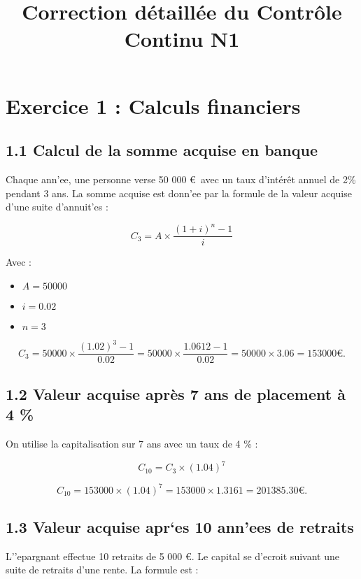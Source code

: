 \documentclass[a4paper, 12pt]{article}
\begin{document}
	
	\title{Correction détaillée du Contrôle Continu N\textsuperscript{\textdegree}1}
	\author{}
	\date{}
	\maketitle
	
	\section*{Exercice 1 : Calculs financiers}
	
	\subsection*{1.1 Calcul de la somme acquise en banque}
	Chaque ann'ee, une personne verse 50 000 \euro\ avec un taux d'intérêt annuel de 2\% pendant 3 ans. La somme acquise est donn'ee par la formule de la valeur acquise d'une suite d'annuit'es :
	
	\begin{equation}
		C_3 = A \times \frac{(1+i)^n -1}{i}
	\end{equation}
	
	Avec :
	\begin{itemize}
		\item $ A = 50 000 $
		\item $ i = 0.02 $
		\item $ n = 3 $
	\end{itemize}
	
	\begin{equation}
		C_3 = 50 000 \times \frac{(1.02)^3 -1}{0.02} = 50 000 \times \frac{1.0612 -1}{0.02} = 50 000 \times 3.06 = 153 000 \euro.
	\end{equation}
	
	\subsection*{1.2 Valeur acquise après 7 ans de placement à 4 \%}
	On utilise la capitalisation sur 7 ans avec un taux de 4 \% :
	
	\begin{equation}
		C_{10} = C_3 \times (1.04)^7
	\end{equation}
	
	\begin{equation}
		C_{10} = 153 000 \times (1.04)^7 = 153 000 \times 1.3161 = 201 385.30 \euro.
	\end{equation}
	
	\subsection*{1.3 Valeur acquise apr`es 10 ann'ees de retraits}
	L’'epargnant effectue 10 retraits de 5 000 \euro. Le capital se d'ecroit suivant une suite de retraits d’une rente.
	La formule est :
	
\end{document}
